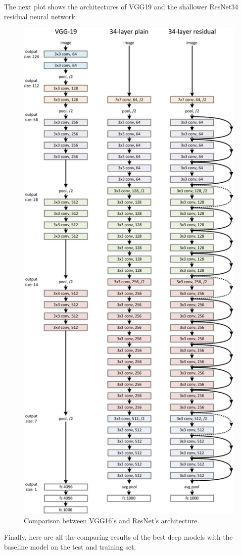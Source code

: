 The next plot shows the architectures of VGG19 and the shallower ResNet34 residual neural network.


\begin{figure}[H]
\centering
\includegraphics[width=.55\textwidth]{images/Chapter2/4-Figure3-1.png}
\caption{Comparison between VGG16's and ResNet's architecture.} 
\label{fig:Res34}
\end{figure} 

Finally, here are all the comparing results of the best deep models with the baseline model on the test and training set.



